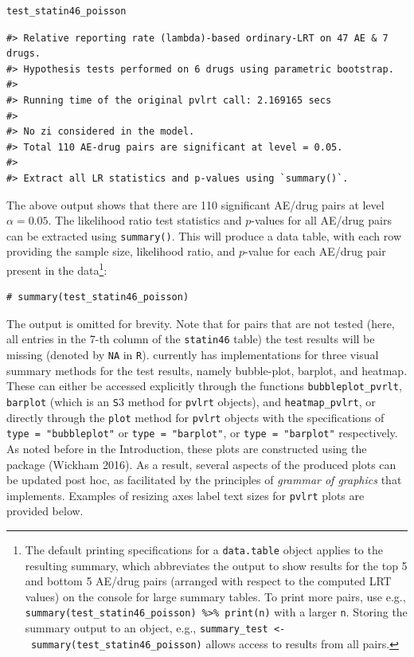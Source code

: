 \begin{verbatim}
test_statin46_poisson
\end{verbatim}

\begin{verbatim}
#> Relative reporting rate (lambda)-based ordinary-LRT on 47 AE & 7 drugs.
#> Hypothesis tests performed on 6 drugs using parametric bootstrap.
#> 
#> Running time of the original pvlrt call: 2.169165 secs
#> 
#> No zi considered in the model.
#> Total 110 AE-drug pairs are significant at level = 0.05.
#> 
#> Extract all LR statistics and p-values using `summary()`.
\end{verbatim}

The above output shows that there are 110 significant AE/drug pairs at level \(\alpha = 0.05\). The likelihood ratio test statistics and \(p\)-values for all AE/drug pairs can be extracted using \texttt{summary()}. This will produce a data table, with each row providing the sample size, likelihood ratio, and \(p\)-value for each AE/drug pair present in the data\footnote{The default printing specifications for a \texttt{data.table} object applies to the resulting summary, which abbreviates the output to show results for the top 5 and bottom 5 AE/drug pairs (arranged with respect to the computed LRT values) on the console for large summary tables. To print more pairs, use e.g., \texttt{summary(test\_statin46\_poisson)\ \%\textgreater{}\%\ print(n)} with a larger \texttt{n}. Storing the summary output to an object, e.g., \texttt{summary\_test\ \textless{}-\ summary(test\_statin46\_poisson)} allows access to results from all pairs.}:

\begin{verbatim}
# summary(test_statin46_poisson) 
\end{verbatim}

The output is omitted for brevity. Note that for pairs that are not tested (here, all entries in the 7-th column of the \texttt{statin46} table) the test results will be missing (denoted by \texttt{NA} in \texttt{R}).  currently has implementations for three visual summary methods for the test results, namely bubble-plot, barplot, and heatmap. These can either be accessed explicitly through the functions \texttt{bubbleplot\_pvrlt}, \texttt{barplot} (which is an \texttt{S}3 method for \texttt{pvlrt} objects), and \texttt{heatmap\_pvlrt}, or directly through the \texttt{plot} method for \texttt{pvlrt} objects with the specifications of \texttt{type\ =\ "bubbleplot"} or \texttt{type\ =\ "barplot"}, or \texttt{type\ =\ "barplot"} respectively. As noted before in the Introduction, these plots are constructed using the  package (Wickham 2016). As a result, several aspects of the produced plots can be updated post hoc, as facilitated by the principles of \emph{grammar of graphics} that  implements. Examples of resizing axes label text sizes for \texttt{pvlrt} plots are provided below.

